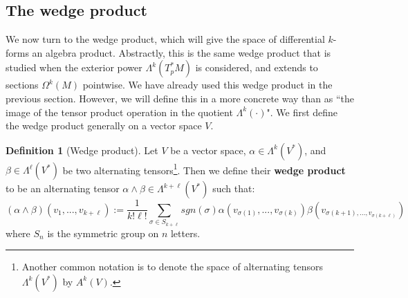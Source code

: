 \documentclass[11pt, oneside]{article}   	%
\theoremstyle{definition}
\newtheorem{definition}{Definition}[section]
\begin{document}
\subsection{The wedge product}

We now turn to the wedge product, which will give the space of differential $k$-forms an algebra product. Abstractly, this 
is the same wedge product that is studied when the exterior power $\Lambda^k(T_p^* M)$ is considered, and extends 
to sections $\Omega^k(M)$ pointwise. We have already used this wedge product in the previous section. However, we will 
define this in a more concrete way than as ``the image of the tensor product operation in the quotient $\Lambda^k(\cdot)$". We 
first define the wedge product generally on a vector space $V$. 

\begin{definition}[Wedge product]
	Let $V$ be a vector space, $\alpha\in\Lambda^k(V^*)$, and $\beta\in\Lambda^\ell(V^*)$ be two alternating 
	tensors\footnote{Another common notation is to denote the space of alternating tensors 
	$\Lambda^k(V^*)$ by $A^k(V)$.}. Then we define their \textbf{wedge product} to be an alternating tensor 
	$\alpha\wedge\beta\in\Lambda^{k + \ell}(V^*)$ such that:
	\begin{equation}
		(\alpha\wedge\beta)(v_1, ..., v_{k + \ell}) := \frac{1}{k!\ell!}\sum_{\sigma\in S_{k + \ell}}sgn(\sigma)
		\alpha(v_{\sigma(1)}, ..., v_{\sigma(k)})\beta(v_{\sigma(k + 1), ..., v_{\sigma(k + \ell)}})~
		\label{eq:wedge}
	\end{equation}
	where $S_n$ is the symmetric group on $n$ letters. 
\end{definition}
\end{document}

